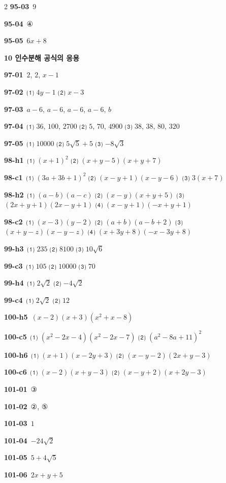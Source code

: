 \documentclass[10pt,a4paper]{article}
\begin{document}
\begin{multicols}{2}
\noindent\textbf{95-03}\ $9$\par
\noindent\textbf{95-04}\ ④\par
\noindent\textbf{95-05}\ $6x+8$\par
\noindent\textbf{10 인수분해 공식의 응용}\par\smallskip
\noindent\textbf{97-01}\ $2$, $2$, $x-1$\par
\noindent\textbf{97-02}\ ⑴ $4y-1$ ⑵ $x-3$\par
\noindent\textbf{97-03}\ $a-6$, $a-6$, $a-6$, $a-6$, $b$\par
\noindent\textbf{97-04}\ ⑴ $36$, $100$, $2700$ ⑵ $5$, $70$, $4900$ ⑶ $38$, $38$, $80$, $320$\par
\noindent\textbf{97-05}\ ⑴ $10000$ ⑵ $5\sqrt{5}+5$ ⑶ $-8\sqrt{3}$\par
\noindent\textbf{98-h1}\ ⑴ $(x+1)^2$ ⑵ $(x+y-5)(x+y+7)$\par
\noindent\textbf{98-c1}\ ⑴ $(3a+3b+1)^2$ ⑵ $(x-y+1)(x-y-6)$ ⑶ $3(x+7)$\par
\noindent\textbf{98-h2}\ ⑴ $(a-b)(a-c)$ ⑵ $(x-y)(x+y+5)$ ⑶ $(2x+y+1)(2x-y+1)$ ⑷ $(x-y+1)(-x+y+1)$\par
\noindent\textbf{98-c2}\ ⑴ $(x-3)(y-2)$ ⑵ $(a+b)(a-b+2)$ ⑶ $(x+y-z)(x-y-z)$ ⑷ $(x+3y+8)(-x-3y+8)$\par
\noindent\textbf{99-h3}\ ⑴ $235$ ⑵ $8100$ ⑶ $10\sqrt{6}$\par
\noindent\textbf{99-c3}\ ⑴ $105$ ⑵ $10000$ ⑶ $70$\par
\noindent\textbf{99-h4}\ ⑴ $2\sqrt{2}$ ⑵ $-4\sqrt{2}$\par
\noindent\textbf{99-c4}\ ⑴ $2\sqrt{2}$ ⑵ $12$\par
\noindent\textbf{100-h5}\ $(x-2)(x+3)(x^2+x-8)$\par
\noindent\textbf{100-c5}\ ⑴ $(x^2-2x-4)(x^2-2x-7)$ ⑵ $(a^2-8a+11)^2$\par
\noindent\textbf{100-h6}\ ⑴ $(x+1)(x-2y+3)$ ⑵ $(x-y-2)(2x+y-3)$\par
\noindent\textbf{100-c6}\ ⑴ $(x-2)(x+y-3)$ ⑵ $(x-y+2)(x+2y-3)$\par
\noindent\textbf{101-01}\ ③\par
\noindent\textbf{101-02}\ ②, ⑤\par
\noindent\textbf{101-03}\ $1$\par
\noindent\textbf{101-04}\ $-24\sqrt{2}$\par
\noindent\textbf{101-05}\ $5+4\sqrt{5}$\par
\noindent\textbf{101-06}\ $2x+y+5$\par

\end{multicols}
\end{document}
